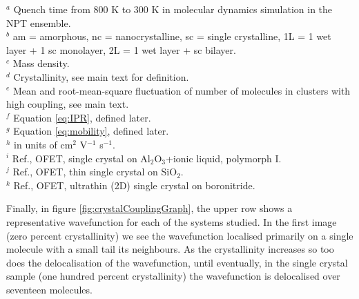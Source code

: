 $^a$ Quench time from 800 K to 300 K in molecular dynamics simulation in the NPT ensemble. \\
$^b$ am = amorphous, nc = nanocrystalline, sc = single crystalline, 1L = 1 wet layer + 1 sc monolayer, 2L = 1 wet layer + sc bilayer. \\
$^c$ Mass density. \\
$^d$ Crystallinity, see main text for definition. \\
$^e$ Mean and root-mean-square fluctuation of number of molecules in clusters with high coupling, see main text. \\
$^f$ Equation \eqref{eq:IPR}, defined later.  \\
$^g$ Equation \eqref{eq:mobility}, defined later. \\
$^h$ in units of cm$^2$ V$^{-1}$ s$^{-1}$. \\
$^i$ Ref.\cite{Takeyama2012_PentCryst}, OFET, single crystal on Al$_2$O$_3$+ionic liquid, polymorph I. \\
$^j$ Ref.\cite{Arabi2016}, OFET, thin single crystal on SiO$_2$. \\
$^k$ Ref.\cite{Zhang2016TF}, OFET, ultrathin (2D) single crystal on boronitride.

Finally, in figure \ref{fig:crystalCouplingGraph}, the upper row shows a representative wavefunction for each of the systems studied. In the first image (zero percent crystallinity) we see the wavefunction localised primarily on a single molecule with a small tail its neighbours. As the crystallinity increases so too does the delocalisation of the wavefunction, until eventually, in the single crystal sample (one hundred percent crystallinity) the wavefunction is delocalised over seventeen molecules.

